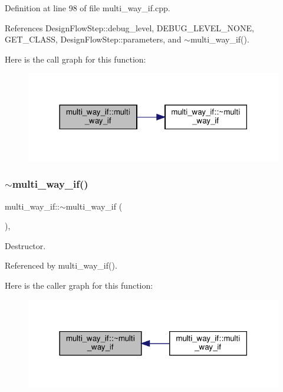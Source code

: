 Definition at line 98 of file multi\+\_\+way\+\_\+if.\+cpp.



References Design\+Flow\+Step\+::debug\+\_\+level, D\+E\+B\+U\+G\+\_\+\+L\+E\+V\+E\+L\+\_\+\+N\+O\+NE, G\+E\+T\+\_\+\+C\+L\+A\+SS, Design\+Flow\+Step\+::parameters, and $\sim$multi\+\_\+way\+\_\+if().

Here is the call graph for this function\+:
\nopagebreak
\begin{figure}[H]
\begin{center}
\leavevmode
\includegraphics[width=318pt]{dd/dca/classmulti__way__if_ae2ba8078520ffa6983a72c4d955c8314_cgraph}
\end{center}
\end{figure}
\mbox{\label{classmulti__way__if_aee90986a58430ee295582e404e5922ec}} 
\subsubsection{\texorpdfstring{$\sim$multi\+\_\+way\+\_\+if()}{~multi\_way\_if()}}
{\footnotesize\ttfamily multi\+\_\+way\+\_\+if\+::$\sim$multi\+\_\+way\+\_\+if (\begin{DoxyParamCaption}{ }\end{DoxyParamCaption})\hspace{0.3cm}{\ttfamily [override]}, {\ttfamily [default]}}



Destructor. 



Referenced by multi\+\_\+way\+\_\+if().

Here is the caller graph for this function\+:
\nopagebreak
\begin{figure}[H]
\begin{center}
\leavevmode
\includegraphics[width=318pt]{dd/dca/classmulti__way__if_aee90986a58430ee295582e404e5922ec_icgraph}
\end{center}
\end{figure}


